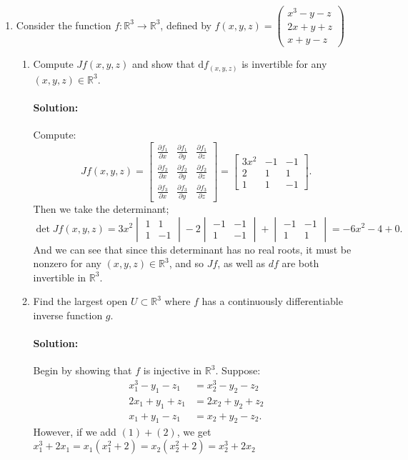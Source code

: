 \documentclass{article}
\begin{document}
\begin{enumerate} 
\item Consider the function $f:\mathbb{R}^3\to\mathbb{R}^3$, defined by  
$f(x,y,z)=\begin{pmatrix}
x^3-y-z\\2x+y+z\\x+y-z
\end{pmatrix}$  
\begin{enumerate}[label= (\alph*)] 
    \item Compute $Jf(x,y,z)$ and show that $\mathrm{d}f_{(x,y,z)}$ is invertible for any $(x,y,z)\in\mathbb{R}^3$.  
    \paragraph{Solution: } Compute:
    \[
     Jf(x,y,z)=\begin{bmatrix}\frac{\partial f_1}{\partial x}&\frac{\partial f_1}{\partial y}&\frac{\partial f_1}{\partial z}\\\frac{\partial f_2}{\partial x}&\frac{\partial f_2}{\partial y}&\frac{\partial f_2}{\partial z}\\ \frac{\partial f_3}{\partial x}&\frac{\partial f_3}{\partial y}&\frac{\partial f_3}{\partial z}\end{bmatrix}
     =\begin{bmatrix} 3x^2&-1&-1\\
     2&1&1\\
     1&1&-1 \end{bmatrix} 
    .\] 
    Then we take the determinant;
    \[
        \det Jf(x,y,z)=3x^2\begin{vmatrix} 1&1\\1&-1 \end{vmatrix} -2\begin{vmatrix} -1&-1\\1&-1 \end{vmatrix} +\begin{vmatrix} -1&-1\\1&1 \end{vmatrix} =-6x^2-4+0
    .\] 
    And we can see that since this determinant has no real roots, it must be nonzero for any $(x,y,z)\in \mathbb{R}^3$, and so $Jf$, as well as $df$ are both invertible in $\mathbb{R}^3$.

    \item Find the largest open $U\subset\mathbb{R}^3$ where $f$ has a continuously differentiable inverse function $g.$  
        \paragraph{Solution: }Begin by showing that $f$ is injective in $\mathbb{R}^3$. Suppose:
        \begin{align*}
            x_1^3-y_1-z_1&=x_2^3-y_2-z_2\tag{1}\\
            2x_1+y_1+z_1&=2x_2+y_2+z_2\tag{2}\\
            x_1+y_1-z_1&=x_2+y_2-z_2\tag{3}
        .\end{align*}
        However, if we add $(1)+(2)$, we get $x_1^3+2x_1=x_1(x_1^2+2)=x_2(x_2^2+2)=x_2^3+2x_2$


\end{enumerate}
\end{enumerate}
\end{document}
